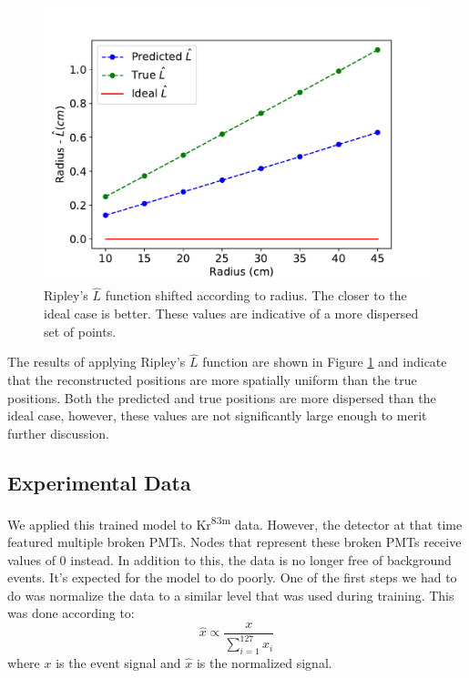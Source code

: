\documentclass[thesis.tex]{subfiles}
\begin{document}
\begin{figure}[t]
	\centering
	\includegraphics[width=0.8\linewidth]{figures/gcn28_ripley-L.pdf}
	\caption{
	Ripley's $\widehat{L}$ function shifted according to radius.
	The closer to the ideal case is better.
	These values are indicative of a more dispersed set of points.
	}
	\label{fig:Ripley}
\end{figure}

\par The results of applying Ripley's $\widehat{L}$ function are shown in Figure \ref{fig:Ripley} and indicate that the reconstructed positions are more spatially uniform than the true positions.
Both the predicted and true positions are more dispersed than the ideal case, however, these values are not significantly large enough to merit further discussion.

\subsection{Experimental Data}\label{subsec:Experiment}
We applied this trained model to Kr\textsuperscript{83m} data.
However, the detector at that time featured multiple broken PMTs.
Nodes that represent these broken PMTs receive values of 0 instead.
In addition to this, the data is no longer free of background events.
It's expected for the model to do poorly.
One of the first steps we had to do was normalize the data to a similar level that was used during training.
This was done according to:
\begin{equation}
	\hat{x} \propto \dfrac{x}{\sum_{i=1}^{127} x_i}
\end{equation}
where $x$ is the event signal and $\hat{x}$ is the normalized signal.
\end{document}
